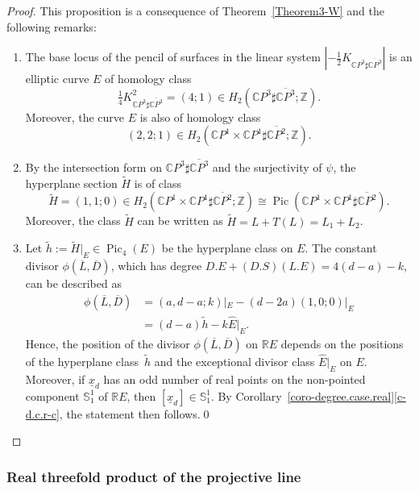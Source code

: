 \documentclass[11pt]{amsart}
\numberwithin{equation}{section}
\theoremstyle{definition}
\theoremstyle{plain}
\theoremstyle{remark}
\newcommand{\R}{\mathbb{R}}
\newcommand{\Z}{\mathbb{Z}}
\newcommand{\C}{\mathbb{C}}
\DeclareMathOperator{\Pic}{Pic}
\begin{document}
\begin{proof}
  This proposition is a consequence of Theorem~\ref{Theorem3-W}
    and the following remarks: 
    \begin{enumerate}
        \item The base locus of the pencil of surfaces in the linear system $|-\frac{1}{2}K_{\C P^3\sharp \overline{\C P^3}}|$ is an elliptic curve $E$ of homology class 
        $$\tfrac{1}{4}K_{\C P^3\sharp \overline{\C P^3}}^2=(4;1)\in H_2\left(\C P^3\sharp \overline{\C P^3};\Z\right).$$
        Moreover, the curve $E$ is also of homology class 
        $$(2,2;1)\in  H_2\left(\C P^1\times \C P^1 \sharp \overline{\C P^2};\Z\right).$$
        \item By the intersection form on $\C P^3 \sharp \overline{\C P^3}$ and the surjectivity of $\psi$, the hyperplane section $\tilde{H}$ is of class 
        $$\tilde{H}=(1,1;0) \in H_2\left(\C P^1\times \C P^1 \sharp \overline{\C P^2};\Z\right) \cong \Pic\left(\C P^1\times \C P^1 \sharp \overline{\C P^2}\right).$$
        Moreover, the class $\tilde{H}$ can be written as
        $\tilde{H}=L+T(L)=L_1+L_2$.
        \item  Let $\tilde{h}:=\tilde{H}|_E \in \Pic_4(E)$ be the hyperplane class on $E$. The constant divisor $ \phi(\overline{L},\overline{D})$, which has degree $D.E+(D.S)(L.E)=4(d-a)-k$, can be described  as 
        \begin{align*}
           \phi\left(\overline{L},\overline{D}\right)&=(a,d-a;k)|_E-(d-2a) (1,0;0)|_E\\
           &=(d-a)\tilde{h}-k\hat{E}|_E.
        \end{align*}
        Hence, the position of the divisor $\phi(\overline{L},\overline{D})$ on $\R E$ depends on the positions of the hyperplane class~$\tilde{h}$ and the exceptional divisor class $\hat{E}|_E$ on $E$. Moreover, if $\underline{x}_d$ has an odd number of real points on the non-pointed component $\mathbb{S}^1_1$ of $\R E$, then $[\underline{x}_d]\in \mathbb{S}^1_1$. By Corollary~\ref{coro-degree.case.real}\eqref{c-d.c.r-c}, the statement then follows.\hfill\qed
    \end{enumerate}
    \renewcommand{\qed}{}
\end{proof}

  \subsubsection{Real threefold product of the projective line} \label{Subsect-exam.deg.6.W}
  
\end{document}
